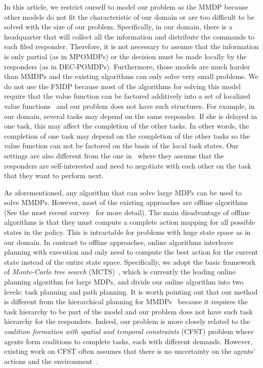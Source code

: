 In this article, we restrict ourself to model our problem as the
MMDP because other models do not fit the characteristic of our
domain or are too difficult to be solved with the size of our
problem. Specifically, in our domain, there is a headquarter that
will collect all the information and distribute the commands to
each filed responder. Therefore, it is not necessary to assume that
the information is only partial (as in MPOMDPs) or the decision
must be made locally by the responders (as in DEC-POMDPs).
Furthermore, those models are much harder than MMDPs and the
existing algorithms can only solve very small problems. We do not
use the FMDP because most of the algorithms for solving this model
require that the value function can be factored additively into a
set of localized value
functions~\cite{koller2000policy,guestrin2001multiagent,guestrin2003efficient}
and our problem does not have such structures. For example, in our
domain, several tasks may depend on the same responder. If she is
delayed in one task, this may affect the completion of the other
tasks. In other words, the completion of one task may depend on the
completion of the other tasks so the value function can not be
factored on the basis of the local task states. Our settings are
also different from the one in~\cite{Chapman2009} where they assume
that the responders are self-interested and need to negotiate with
each other on the task that they want to perform next.

As aforementioned, any algorithm that can solve large MDPs can be
used to solve MMDPs. However, most of the existing approaches are
offline algorithms (See the most recent
survey~\cite{kolobov2012planning} for more detail). The main
disadvantage of offline algorithms is that they must compute a
complete action mapping for all possible states in the policy. This
is intractable for problems with huge state space as in our domain.
In contrast to offline approaches, online algorithms interleave
planning with execution and only need to compute the best action
for the current state instead of the entire state space.
Specifically, we adopt the basic framework of {\em Monte-Carlo tree
search} (MCTS)~\cite{kocsis2006bandit}, which is currently the
leading online planning algorithm for large MDPs, and divide our
online algorithm into two levels: task planning and path planning.
It is worth pointing out that our method is different from the
hierarchical planning for MMDPs~\cite{musliner2006coordinated}
because it requires the task hierarchy to be part of the model and
our problem does not have such task hierarchy for the responders.
Indeed, our problem is more closely related to the {\em coalition
formation with spatial and temporal constraints} (CFST) problem
where agents form coalitions to complete tasks, each with different
demands. However, existing work on CFST often assumes that there is
no uncertainty on the agents' actions and the
environment~\cite{ramchurn:etal:2010}.

